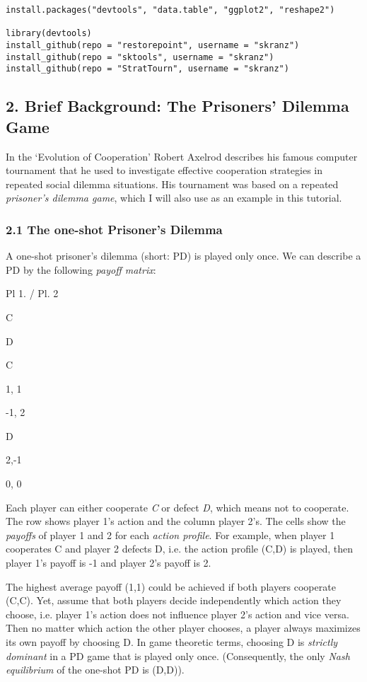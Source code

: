 \documentclass[]{article}
\begin{document}
\begin{verbatim}
install.packages("devtools", "data.table", "ggplot2", "reshape2")

library(devtools)
install_github(repo = "restorepoint", username = "skranz")
install_github(repo = "sktools", username = "skranz")
install_github(repo = "StratTourn", username = "skranz")
\end{verbatim}

\subsection{2. Brief Background: The Prisoners' Dilemma Game}

In the `Evolution of Cooperation' Robert Axelrod describes his famous
computer tournament that he used to investigate effective cooperation
strategies in repeated social dilemma situations. His tournament was
based on a repeated \emph{prisoner's dilemma game}, which I will also
use as an example in this tutorial.

\subsubsection{2.1 The one-shot Prisoner's Dilemma}

A one-shot prisoner's dilemma (short: PD) is played only once. We can
describe a PD by the following \emph{payoff matrix}:

Pl 1. / Pl. 2

C

D

C

1, 1

-1, 2

D

2,-1

0, 0

Each player can either cooperate \emph{C} or defect \emph{D}, which
means not to cooperate. The row shows player 1's action and the column
player 2's. The cells show the \emph{payoffs} of player 1 and 2 for each
\emph{action profile}. For example, when player 1 cooperates C and
player 2 defects D, i.e. the action profile (C,D) is played, then player
1's payoff is -1 and player 2's payoff is 2.

The highest average payoff (1,1) could be achieved if both players
cooperate (C,C). Yet, assume that both players decide independently
which action they choose, i.e. player 1's action does not influence
player 2's action and vice versa. Then no matter which action the other
player chooses, a player always maximizes its own payoff by choosing D.
In game theoretic terms, choosing D is \emph{strictly dominant} in a PD
game that is played only once. (Consequently, the only \emph{Nash
equilibrium} of the one-shot PD is (D,D)).
\end{document}
